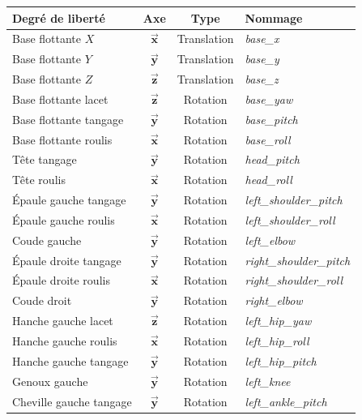 \begin{table}[htb]
\begin{center}
    \begin{tabular}{|l|c|c|l|}
        \hline
        Degré de liberté & Axe & Type & Nommage\\
        \hline
        Base flottante $X$ & $\vec{\bm{x}}$ & Translation & \textit{base\_x} \\
        Base flottante $Y$ & $\vec{\bm{y}}$ & Translation & \textit{base\_y} \\
        Base flottante $Z$ & $\vec{\bm{z}}$ & Translation & \textit{base\_z} \\
        Base flottante lacet & $\vec{\bm{z}}$ & Rotation & \textit{base\_yaw} \\
        Base flottante tangage & $\vec{\bm{y}}$ & Rotation & \textit{base\_pitch} \\
        Base flottante roulis & $\vec{\bm{x}}$ & Rotation & \textit{base\_roll} \\
        \hline
        Tête tangage & $\vec{\bm{y}}$ & Rotation & \textit{head\_pitch} \\
        Tête roulis & $\vec{\bm{x}}$ & Rotation & \textit{head\_roll} \\
        \hline
        Épaule gauche tangage & $\vec{\bm{y}}$ & Rotation & \textit{left\_shoulder\_pitch} \\
        Épaule gauche roulis & $\vec{\bm{x}}$ & Rotation & \textit{left\_shoulder\_roll} \\
        Coude gauche & $\vec{\bm{y}}$ & Rotation & \textit{left\_elbow} \\
        Épaule droite tangage & $\vec{\bm{y}}$ & Rotation & \textit{right\_shoulder\_pitch} \\
        Épaule droite roulis & $\vec{\bm{x}}$ & Rotation & \textit{right\_shoulder\_roll} \\
        Coude droit & $\vec{\bm{y}}$ & Rotation & \textit{right\_elbow} \\
        \hline
        Hanche gauche lacet & $\vec{\bm{z}}$ & Rotation & \textit{left\_hip\_yaw} \\
        Hanche gauche roulis & $\vec{\bm{x}}$ & Rotation & \textit{left\_hip\_roll} \\
        Hanche gauche tangage & $\vec{\bm{y}}$ & Rotation & \textit{left\_hip\_pitch} \\
        Genoux gauche & $\vec{\bm{y}}$ & Rotation & \textit{left\_knee} \\
        Cheville gauche tangage & $\vec{\bm{y}}$ & Rotation & \textit{left\_ankle\_pitch} \\

\end{tabular}
\end{center}
\end{table}
